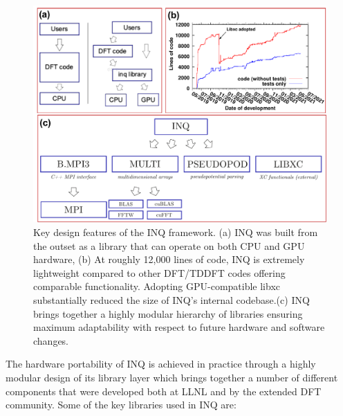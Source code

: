 \begin{figure}[h]
    \centering
    \includegraphics[width=1.0\linewidth]{figures/INQ_design_features.pdf}
    \caption{
        Key design features of the INQ framework. (a) INQ was built from the outset as a library that can operate on both CPU and GPU hardware, (b) At roughly 12,000 lines of code, INQ is extremely lightweight compared to other DFT/TDDFT codes offering comparable functionality. Adopting GPU-compatible libxc substantially reduced the size of INQ's internal codebase.(c) INQ brings together a highly modular hierarchy of libraries ensuring maximum adaptability with respect to future hardware and software changes.    
    }
    \label{fig:inq_design}
\end{figure}
\newline
The hardware portability of \textsc{INQ} is achieved in practice through a highly modular design of its library layer which brings together a number of different components that were developed both at LLNL and by the extended DFT community. Some of the key libraries used in INQ are:
